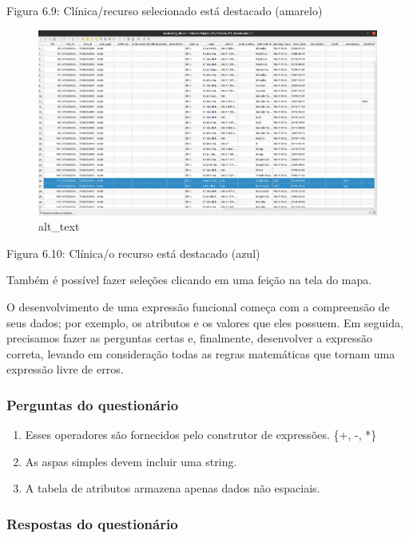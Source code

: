 \documentclass[
]{book}
\providecommand{\tightlist}{%
  \setlength{\itemsep}{0pt}\setlength{\parskip}{0pt}}
\begin{document}
Figura 6.9: Clínica/recurso selecionado está destacado (amarelo)

\begin{figure}
\centering
\includegraphics{media/modulo6/selected-attr.png}
\caption{alt\_text}
\end{figure}

Figura 6.10: Clínica/o recurso está destacado (azul)

Também é possível fazer seleções clicando em uma feição na tela do mapa.

O desenvolvimento de uma expressão funcional começa com a compreensão de seus dados; por exemplo, os atributos e os valores que eles possuem. Em seguida, precisamos fazer as perguntas certas e, finalmente, desenvolver a expressão correta, levando em consideração todas as regras matemáticas que tornam uma expressão livre de erros.

\hypertarget{perguntas-do-questionuxe1rio-15}{%
\subsubsection{\texorpdfstring{\textbf{Perguntas do questionário}}{Perguntas do questionário}}\label{perguntas-do-questionuxe1rio-15}}

\begin{enumerate}
\def\labelenumi{\arabic{enumi}.}
\tightlist
\item
  Esses operadores são fornecidos pelo construtor de expressões. \{+, -, *\}
\item
  As aspas simples devem incluir uma string.
\item
  A tabela de atributos armazena apenas dados não espaciais.
\end{enumerate}

\hypertarget{respostas-do-questionuxe1rio-6}{%
\subsubsection{\texorpdfstring{\textbf{Respostas do questionário}}{Respostas do questionário}}\label{respostas-do-questionuxe1rio-6}}
\end{document}
